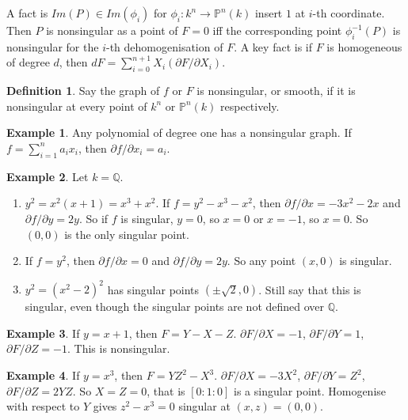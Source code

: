 \documentclass{article}
\newcommand{\Q}{\mathbb{Q}}
\renewcommand{\P}{\mathbb{P}}
\newcommand{\rb}[1]{\left( #1 \right)}
\renewcommand{\sb}[1]{\left[ #1 \right]}
\theoremstyle{definition}\newtheorem{definition}{Definition}[section]
\theoremstyle{definition}\newtheorem{remark}[definition]{Remark}
\theoremstyle{definition}\newtheorem*{example}{Example}
\theoremstyle{definition}\newtheorem*{note}{Note}
\begin{document}
A fact is $ Im\rb{P} \in Im\rb{\phi_i} $ for $ \phi_i : k^n \to \P^n\rb{k} $ insert $ 1 $ at $ i $-th coordinate. Then $ P $ is nonsingular as a point of $ F = 0 $ iff the corresponding point $ \phi_i^{-1}\rb{P} $ is nonsingular for the $ i $-th dehomogenisation of $ F $. A key fact is if $ F $ is homogeneous of degree $ d $, then $ dF = \sum_{i = 0}^{n + 1} X_i\rb{\partial F / \partial X_i} $.

\begin{definition}
Say the graph of $ f $ or $ F $ is nonsingular, or smooth, if it is nonsingular at every point of $ k^n $ or $ \P^n\rb{k} $ respectively.
\end{definition}

\begin{example}
Any polynomial of degree one has a nonsingular graph. If $ f = \sum_{i = 1}^n a_ix_i $, then $ \partial f / \partial x_i = a_i $.
\end{example}

\begin{example}
Let $ k = \Q $.
\begin{enumerate}
\item $ y^2 = x^2\rb{x + 1} = x^3 + x^2 $. If $ f = y^2 - x^3 - x^2 $, then $ \partial f / \partial x = -3x^2 - 2x $ and $ \partial f / \partial y = 2y $. So if $ f $ is singular, $ y = 0 $, so $ x = 0 $ or $ x = -1 $, so $ x = 0 $. So $ \rb{0, 0} $ is the only singular point.
\item If $ f = y^2 $, then $ \partial f / \partial x = 0 $ and $ \partial f / \partial y = 2y $. So any point $ \rb{x, 0} $ is singular.
\item $ y^2 = \rb{x^2 - 2}^2 $ has singular points $ \rb{\pm \sqrt{2}, 0} $. Still say that this is singular, even though the singular points are not defined over $ \Q $.
\end{enumerate}
\end{example}

\begin{example}
If $ y = x + 1 $, then $ F = Y - X - Z $. $ \partial F / \partial X = -1 $, $ \partial F / \partial Y = 1 $, $ \partial F / \partial Z = -1 $. This is nonsingular.
\end{example}

\begin{example}
If $ y = x^3 $, then $ F = YZ^2 - X^3 $. $ \partial F / \partial X = -3X^2 $, $ \partial F / \partial Y = Z^2 $, $ \partial F / \partial Z = 2YZ $. So $ X = Z = 0 $, that is $ \sb{0 : 1 : 0} $ is a singular point. Homogenise with respect to $ Y $ gives $ z^2 - x^3 = 0 $ singular at $ \rb{x, z} = \rb{0, 0} $.
\end{example}
\end{document}
